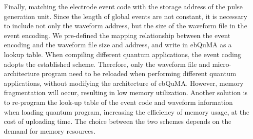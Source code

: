 Finally, matching the electrode event code with the storage address of the pulse generation unit. 
Since the length of global events are not constant, it is necessary to include not only the waveform address, but the size of the waveform file in the event encoding. 
We pre-defined the mapping relationship between the event encoding and the waveform file size and address, and write in ebQuMA as a lookup table. 
When compiling different quantum applications, the event coding adopts the established scheme. 
Therefore, only the waveform file and micro-architecture program need to be reloaded when performing different quantum applications, 
without modifying the architecture of ebQuMA. However, memory fragmentation will occur, resulting in low memory utilization. 
Another solution is to re-program the look-up table of the event code and waveform information when loading quantum program, increasing the efficiency of memory usage, 
at the cost of uploading time. The choice between the two schemes depends on the demand for memory resources.